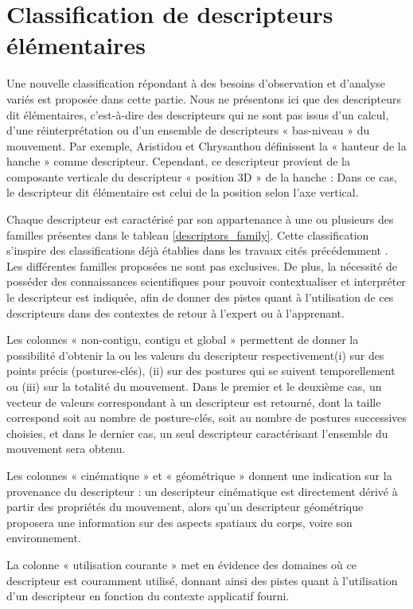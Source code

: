 \section{Classification de descripteurs élémentaires}\label{sec:class_descr}
Une nouvelle classification répondant à des besoins d'observation et d'analyse variés est proposée dans cette partie. Nous ne présentons ici que des descripteurs dit élémentaires, c'est-à-dire des descripteurs qui ne sont pas issus d'un calcul, d'une réinterprétation ou d'un ensemble de descripteurs « bas-niveau » du mouvement. Par exemple, Aristidou et Chrysanthou \parencite{Aristidou2014Fef} définissent la « hauteur de la hanche » comme descripteur. Cependant, ce descripteur provient de la composante verticale du descripteur « position 3D » de la hanche : Dans ce cas, le descripteur dit élémentaire est celui de la position selon l'axe vertical.

Chaque descripteur est caractérisé par son appartenance à une ou plusieurs des familles présentes dans le tableau \ref{descriptors_family}. Cette classification s'inspire des classifications déjà établies dans les travaux cités précédemment \parencite{larboulette2015Descriptors} \parencite{Morel2017Mts}. Les différentes familles proposées ne sont pas exclusives. De plus, la nécessité de posséder des connaissances scientifiques pour pouvoir contextualiser et interpréter le descripteur est indiquée, afin de donner des pistes quant à l'utilisation de ces descripteurs dans des contextes de retour à l'expert ou à l'apprenant.

Les colonnes « non-contigu, contigu et global » permettent de donner la possibilité d'obtenir la ou les valeurs du descripteur respectivement(i) sur des points précis (postures-clés), (ii) sur des postures qui se suivent temporellement ou (iii) sur la totalité du mouvement. Dans le premier et le deuxième cas, un vecteur de valeurs correspondant à un descripteur est retourné, dont la taille correspond soit au nombre de posture-clés, soit au nombre de postures successives choisies, et dans le dernier cas, un seul descripteur caractérisant l'ensemble du mouvement sera obtenu.

Les colonnes « cinématique » et « géométrique » donnent une indication sur la provenance du descripteur : un descripteur cinématique est directement dérivé à partir des propriétés du mouvement, alors qu'un descripteur géométrique proposera une information sur des aspects spatiaux du corps, voire son environnement.

La colonne « utilisation courante » met en évidence des domaines où ce descripteur est couramment utilisé, donnant ainsi des pistes quant à l'utilisation d'un descripteur en fonction du contexte applicatif fourni.

